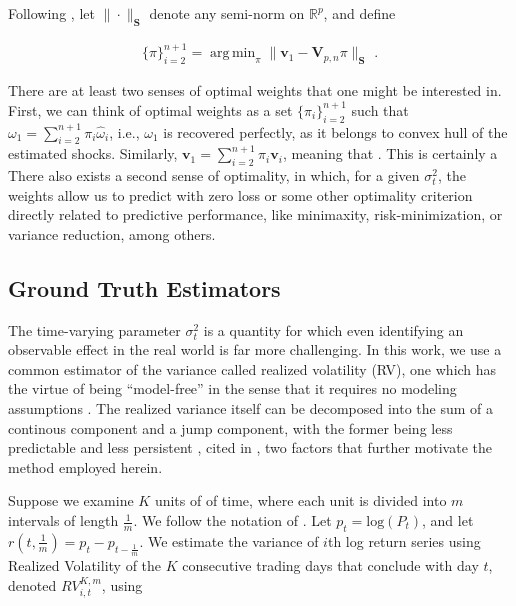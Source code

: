 \documentclass[11pt]{article}
\newcommand{\V}{\textbf{V}}
\newcommand{\weight}{\pi}
\DeclareMathOperator*{\argmin}{arg\,min} %
\theoremstyle{definition}
\begin{document}
    Following \citet{abadie2003economic,abadie2010synthetic}, let $\|\cdot\|_{\textbf{S}}$ denote any semi-norm on $\mathbb{R}^{p}$, and define

    \begin{align*}
    \{\pi\}_{i=2}^{n+1} = \argmin_{\pi}\|\textbf{v}_{1} - \V_{p,n}\pi \|_{\textbf{S}} \text{ .}
    \end{align*}
     
    
  
There are at least two senses of optimal weights that one might be interested in.  First, we can think of optimal weights as a set $\{\weight_{i}\}_{i=2}^{n+1}$ such that $\omega_{1} = \sum^{n+1}_{i=2}\weight_{i}\hat\omega_{i}$, i.e., $\omega_{1}$ is recovered perfectly, as it belongs to convex hull of the estimated shocks.  Similarly, $\textbf{v}_{1} = \sum^{n+1}_{i=2}\weight_{i}\textbf{v}_{i}$, meaning that .  This is certainly a There also exists a second sense of optimality, in which, for a given $\sigma_{t}^{2}$, the weights allow us to predict with zero loss or some other optimality criterion directly related to predictive performance, like minimaxity, risk-minimization, or variance reduction, among others.
  
    \subsection{Ground Truth Estimators}
    \label{Ground Truth Estimators}
    
    The time-varying parameter $\sigma^{2}_{t}$ is a quantity for which even identifying an observable effect in the real world is far more challenging.  In this work, we use a common estimator of the variance called realized volatility (RV), one which has the virtue of being ``model-free'' in the sense that it requires no modeling assumptions \citep{andersen2010stochastic}.  The realized variance itself can be decomposed into the sum of a continous component and a jump component, with the former being less predictable and less persistent \citep{andersen2007roughing}, cited in \citet{de2006forecasting}, two factors that further motivate the method employed herein.
    
    Suppose we examine $K$ units of of time, where each unit is divided into $m$ intervals of length $\frac{1}{m}$.  We follow the notation of  \citet{andersen2009realized}. Let $p_{t} = \text{log}(P_{t})$, and let $r(t,\frac{1}{m}) = p_{t} - p_{t-\frac{1}{m}}$.  We estimate the variance of $i$th log return series using Realized Volatility of the $K$ consecutive trading days that conclude with day $t$, denoted $RV_{i,t}^{K,m}$, using
    
\end{document}
